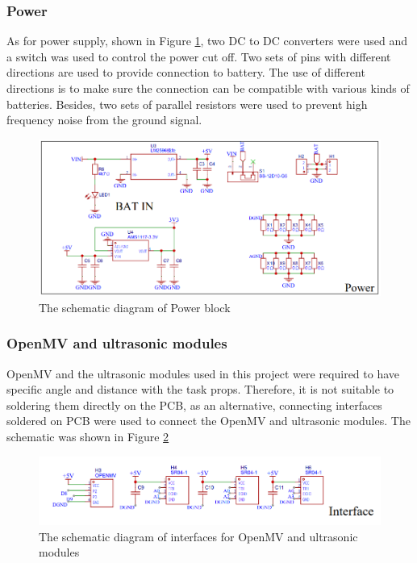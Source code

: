 \documentclass[12pt, a4paper, oneside]{report}
\begin{document}
\subsubsection{Power}
As for power supply, shown in Figure \ref{fig:pcb6}, two DC to DC converters were used and a switch was used to control the power cut off. Two sets of pins with different directions are used to provide connection to battery. The use of different directions is to make sure the connection can be compatible with various kinds of batteries. Besides, two sets of parallel resistors were used to prevent high frequency noise from the ground signal. 

\begin{figure}[!h]
	\centering
	\includegraphics[scale=0.6]{pic/PCB_figure/6_PCB.png}
	\caption{The schematic diagram of Power block}
    \label{fig:pcb6}
\end{figure}

\subsubsection{OpenMV and ultrasonic modules}
OpenMV and the ultrasonic modules used in this project were required to have specific angle and distance with the task props. Therefore, it is not suitable to soldering them directly on the PCB, as an alternative, connecting interfaces soldered on PCB were used to connect the OpenMV and ultrasonic modules. The schematic was shown in Figure \ref{fig:pcb7}
\begin{figure}[!h]
	\centering
	\includegraphics[scale=0.6]{pic/PCB_figure/7_PCB.png}
	\caption{The schematic diagram of interfaces for OpenMV and ultrasonic modules}
    \label{fig:pcb7}
\end{figure}
\end{document}
